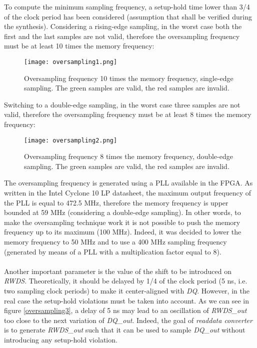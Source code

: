 \documentclass[10pt, english, a4paper, titlepage, oneside]{book}
\begin{document}
To compute the minimum sampling frequency, a setup-hold time lower than 3/4 of the clock period has been considered (assumption that shall be verified during the synthesis). Considering a rising-edge sampling, in the worst case both the first and the last samples are not valid, therefore the oversampling frequency must be at least 10 times the memory frequency:
\vspace{4mm}
\begin{figure}[H]
    \centering
    \captionsetup{width=12cm}
    \texttt{[image: oversampling1.png]}
    \vspace{2mm}
    \caption{\centering Oversampling frequency 10 times the memory frequency, single-edge sampling. The green samples are valid, the red samples are invalid.}
    \label{oversampling1}
\end{figure}
\vspace{4mm}
\noindent Switching to a double-edge sampling, in the worst case three samples are not valid, therefore the oversampling frequency must be at least 8 times the memory frequency:
\vspace{4mm}
\begin{figure}[H]
    \centering
    \captionsetup{width=13cm}
    \texttt{[image: oversampling2.png]}
    \vspace{2mm}
    \caption{\centering Oversampling frequency 8 times the memory frequency, double-edge sampling. The green samples are valid, the red samples are invalid.}
    \label{oversampling2}
\end{figure}
\vspace{4mm}
\noindent The oversampling frequency is generated using a PLL available in the FPGA. As written in the Intel Cyclone 10 LP datasheet, the maximum output frequency of the PLL is equal to 472.5 MHz, therefore the memory frequency is upper bounded at 59 MHz (considering a double-edge sampling). In other words, to make the oversampling technique work it is not possible to push the memory frequency up to its maximum (100 MHz). Indeed, it was decided to lower the memory frequency to 50 MHz and to use a 400 MHz sampling frequency (generated by means of a PLL with a multiplication factor equal to 8). \\ \\
\noindent Another important parameter is the value of the shift to be introduced on \textit{RWDS}. Theoretically, it should be delayed by 1/4 of the clock period (5 ns, i.e. two sampling clock periods) to make it center-aligned with \textit{DQ}. However, in the real case the setup-hold violations must be taken into account. As we can see in figure \ref{oversampling3}, a delay of 5 ns may lead to an oscillation of \textit{RWDS\_out} too close to the next variation of \textit{DQ\_out}. Indeed, the goal of \textit{readdata converter} is to generate \textit{RWDS\_out} such that it can be used to sample \textit{DQ\_out} without introducing any setup-hold violation.
\end{document}
